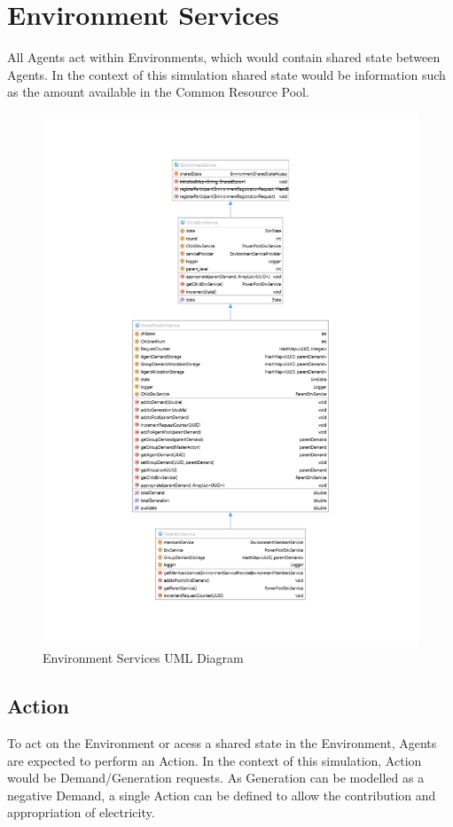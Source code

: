 \section*{Environment Services}
All Agents act within Environments, which would contain shared state between Agents. In the context of this simulation shared state would be information such as the amount available in the Common Resource Pool.

\begin{figure}[!h]
	\centering
	\includegraphics[scale=0.71]{Images/EnvironmentUML.png}
	\caption{Environment Services UML Diagram}
	\label{fig:ServiceUML}
\end{figure}

\subsection*{Action}
To act on the Environment or acess a shared state in the Environment, Agents are expected to perform an Action. In the context of this simulation, Action would be Demand/Generation requests. As Generation can be modelled as a negative Demand, a single Action can be defined to allow the contribution and appropriation of electricity. 

